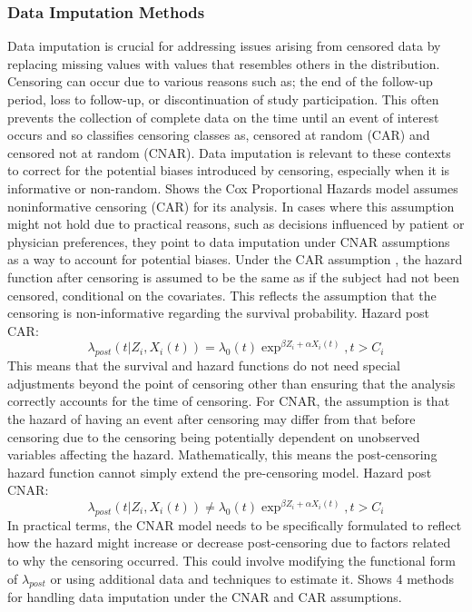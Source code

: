 \subsubsection{Data Imputation Methods}
Data imputation is crucial for addressing issues arising from censored data by replacing missing values with values that resembles others in the distribution. Censoring can occur due to various reasons such as; the end of the follow-up period, loss to follow-up, or discontinuation of study participation. This often prevents the collection of complete data on the time until an event of interest occurs and so \parencite{jin_imputation_2024} classifies censoring classes as, censored at random (CAR) and censored not at random (CNAR). Data imputation is relevant to these contexts to correct for the potential biases introduced by censoring, especially when it is informative or non-random. \parencite{jin_imputation_2024} Shows the Cox Proportional Hazards model assumes noninformative censoring (CAR) for its analysis. In cases where this assumption might not hold due to practical reasons, such as decisions influenced by patient or physician preferences, they point to data imputation under CNAR assumptions as a way to account for potential biases. Under the CAR assumption \parencite{jin_imputation_2024}, the hazard function after censoring is assumed to be the same as if the subject had not been censored, conditional on the covariates. This reflects the assumption that the censoring is non-informative regarding the survival probability. Hazard post CAR: 
\begin{equation} \label{eq:carassmp}\lambda_{post}(t|Z_{i},X_{i}(t)) = \lambda_{0}(t)\exp^{\beta Z_{i} + \alpha X_{i}(t)}, t>C_{i}\end{equation}
\noindent This means that the survival and hazard functions do not need special adjustments beyond the point of censoring other than ensuring that the analysis correctly accounts for the time of censoring. For CNAR, \parencite{jin_imputation_2024} the assumption is that the hazard of having an event after censoring may differ from that before censoring due to the censoring being potentially dependent on unobserved variables affecting the hazard. Mathematically, this means the post-censoring hazard function cannot simply extend the pre-censoring model. Hazard post CNAR:
\begin{equation} \label{eq:cnarassmp}\lambda_{post}(t|Z_{i},X_{i}(t)) \neq \lambda_{0}(t)\exp^{\beta Z_{i} + \alpha X_{i}(t)}, t>C_{i}\end{equation}
\noindent In practical terms, the CNAR model needs to be specifically formulated to reflect how the hazard might increase or decrease post-censoring due to factors related to why the censoring occurred. This could involve modifying the functional form of \(\lambda_{post}\) or using additional data and techniques to estimate it. \parencite{jin_imputation_2024} Shows 4 methods for handling data imputation under the CNAR and CAR assumptions.

